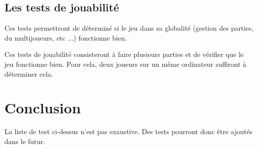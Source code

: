 \subsection{Les tests de jouabilité}

Ces tests permettront de déterminé si le jeu dans sa globalité (gestion des parties, du multijoueurs, etc ...) fonctionne bien.

Ces tests de jouabilité consisteront à faire plusieurs parties et de vérifier que le jeu fonctionne bien. Pour cela, deux joueurs sur un même ordinateur suffiront à déterminer cela.

\newpage

\section*{Conclusion}

La liste de test ci-dessus n'est pas exaustive. Des tests pourront donc être ajoutés dans le futur.
